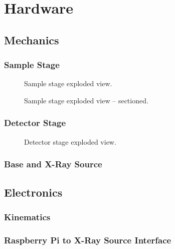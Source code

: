 \chapter{Hardware}
    \section{Mechanics}
        \subsection{Sample Stage}
            \begin{figure}[t]
                \centering
                
                \label{fig:sample stage exploded}%
                \caption[Sample stage exploded view.]{Sample stage exploded view.}
            \end{figure}
            \lipsum
            \begin{figure}[t]
                \centering
                
                \label{fig:sample stage exploded section}%
                \caption[Sample stage exploded view -- sectioned.]{Sample stage exploded view -- sectioned.}
            \end{figure}
        \subsection{Detector Stage}
            \begin{figure}[t]
                \centering
                
                \label{fig:detector stage exploded section}%
                \caption[Detector stage exploded view.]{Detector stage exploded view.}
            \end{figure}
            \lipsum
        \subsection{Base and X-Ray Source}
            \lipsum

    \section{Electronics}
        \subsection{Kinematics}

        \subsection{Raspberry Pi to X-Ray Source Interface}